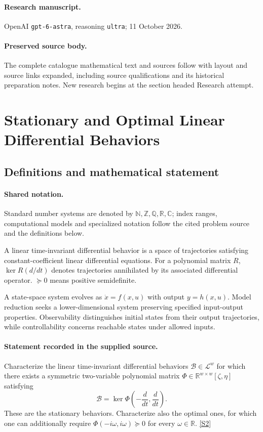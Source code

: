 \documentclass[11pt]{article}
\begin{document}
\paragraph{Research manuscript.} OpenAI \texttt{gpt-6-astra}, reasoning \texttt{ultra}; 11 October 2026.
\paragraph{Preserved source body.} The complete catalogue mathematical text and sources follow with layout and source links expanded, including source qualifications and its historical preparation notes. New research begins at the section headed Research attempt.

\section{Stationary and Optimal Linear Differential Behaviors}\label{statement}

\subsection{Definitions and mathematical statement}

\paragraph{Shared notation.}Standard number systems are denoted by $\mathbb N,\mathbb Z,\mathbb Q,\mathbb R,\mathbb C$; index ranges, computational models and specialized notation follow the cited problem source and the definitions below.


A linear time-invariant differential behavior is a space of trajectories satisfying constant-coefficient linear differential equations. For a polynomial matrix $R$, $\ker R(d/dt)$ denotes trajectories annihilated by its associated differential operator. $\succeq0$ means positive semidefinite.

A state-space system evolves as $\dot x=f(x,u)$ with output $y=h(x,u)$. Model reduction seeks a lower-dimensional system preserving specified input-output properties. Observability distinguishes initial states from their output trajectories, while controllability concerns reachable states under allowed inputs.
\paragraph{Statement recorded in the supplied source.}
Characterize the linear time-invariant differential behaviors $\mathcal{B}\in\mathcal{L}^w$ for which there exists a symmetric two-variable polynomial matrix $\Phi\in\mathbb{R}^{w\times w}[\zeta,\eta]$ satisfying $$\mathcal{B}=\ker\Phi\!\left(-\frac{d}{dt},\frac{d}{dt}\right).$$ These are the stationary behaviors. Characterize also the optimal ones, for which one can additionally require $\Phi(-i\omega,i\omega)\succeq0$ for every $\omega\in\mathbb{R}$. \href{https://doi.org/10.4171/owr/2005/11}{[S2]}
\end{document}
